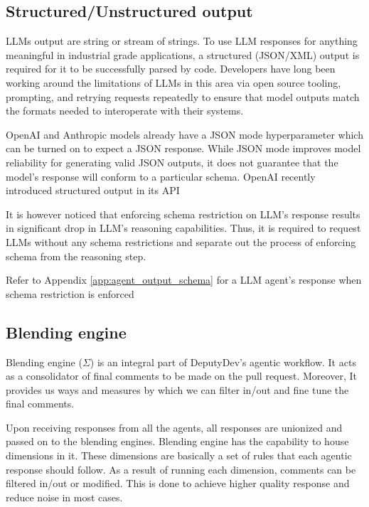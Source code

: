 

\subsection{Structured/Unstructured output}
LLMs output are string or stream of strings. To use LLM responses for anything meaningful in industrial grade applications, a structured (JSON/XML) output is required for it to be successfully parsed by code. Developers have long been working around the limitations of LLMs in this area via open source tooling, prompting, and retrying requests repeatedly to ensure that model outputs match the formats needed to interoperate with their systems.

OpenAI and Anthropic models already have a JSON mode hyperparameter which can be turned on to expect a JSON response. While JSON mode improves model reliability for generating valid JSON outputs, it does not guarantee that the model's response will conform to a particular schema. OpenAI recently introduced structured output in its API \cite{Introduc39:online}

It is however noticed that enforcing schema restriction on LLM's response results in significant drop in LLM's reasoning capabilities. \cite{tam2024letspeakfreelystudy} Thus, it is required to request LLMs without any schema restrictions and separate out the process of enforcing schema from the reasoning step.

Refer to Appendix \ref{app:agent_output_schema} for a LLM agent's response when schema restriction is enforced

\subsection{Blending engine}
Blending engine ($\Sigma$) is an integral part of DeputyDev's agentic workflow. It acts as a consolidator of final comments to be made on the pull request. Moreover, It provides us ways and measures by which we can filter in/out and fine tune the final comments.

Upon receiving responses from all the agents, all responses are unionized and passed on to the blending engines. Blending engine has the capability to house dimensions in it. These dimensions are basically a set of rules that each agentic response should follow. As a result of running each dimension, comments can be filtered in/out or modified. This is done to achieve higher quality response and reduce noise in most cases.

